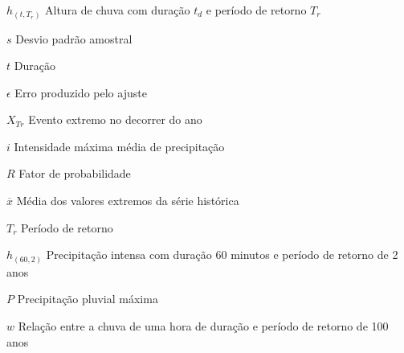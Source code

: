 \begin{simbolos}
  \item[$ h_{(t, T_r)} $] Altura de chuva com duração $t_d$ e período de retorno $T_r$
  \item[$ s $] Desvio padrão amostral
  \item[$ t $] Duração
  \item[$ \epsilon $] Erro produzido pelo ajuste
  \item[$ X_{Tr} $] Evento extremo no decorrer do ano
  \item[$ i $] Intensidade máxima média de precipitação
  \item[$ R $] Fator de probabilidade
  \item[$ \overline{x} $] Média dos valores extremos da série histórica
  \item[$ T_r $] Período de retorno
  \item[$ h_{(60,2)} $] Precipitação intensa com duração 60 minutos e período de retorno de 2 anos 
  \item[$ P $] Precipitação pluvial máxima
  \item[$ w $] Relação entre a chuva de uma hora de duração e período de retorno de 100 anos
\end{simbolos}
